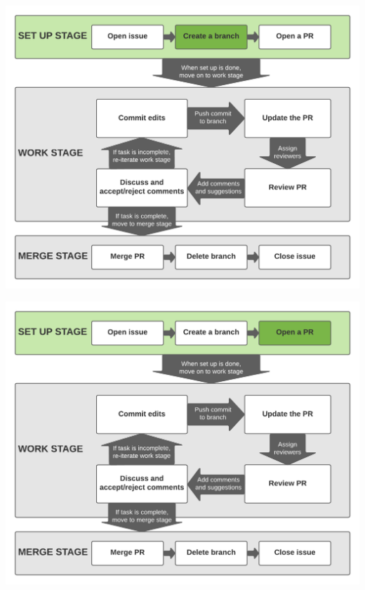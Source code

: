 \documentclass[aspectratio=169]{beamer} %
\begin{document}
\begin{frame}
	\includegraphics[width=\textwidth]{./img/branch-pr-merge-cycle-S1-2.png}
\end{frame}

\begin{frame}
	\includegraphics[width=\textwidth]{./img/branch-pr-merge-cycle-S1-3.png}
\end{frame}
\end{document}
